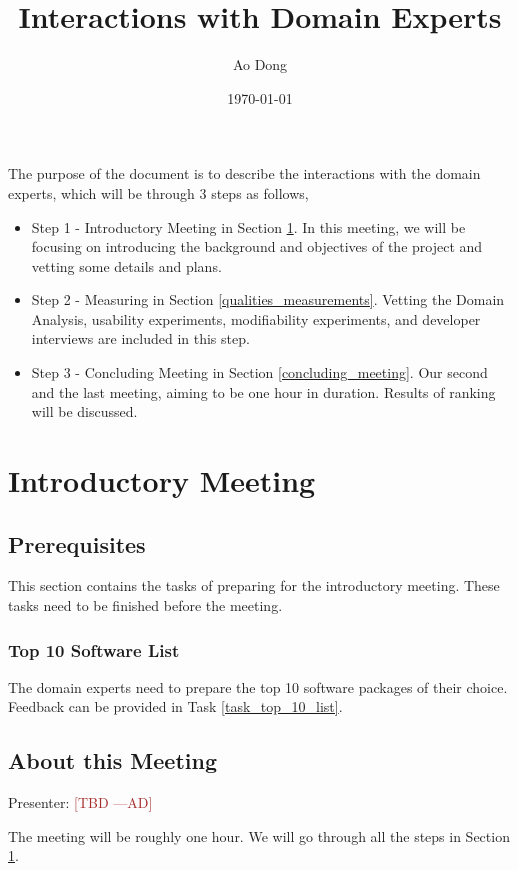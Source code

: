 \documentclass[12pt]{article}
\title{Interactions with Domain Experts}
\author{Ao Dong}
\date{\today}
\newcommand{\authornote}[3]{\textcolor{#1}{[#3 ---#2]}}
\newcommand{\authornote}[3]{}
\newcommand{\ad}[1]{\authornote{brown}{AD}{#1}} %
\begin{document}
\maketitle

The purpose of the document is to describe the interactions with the domain
experts, which will be through 3 steps as follows,
\begin{itemize}
\item Step 1 - Introductory Meeting in Section \ref{introductory_meeting}. In
this meeting, we will be focusing on introducing the background and objectives
of the project and vetting some details and plans.
\item Step 2 - Measuring in Section \ref{qualities_measurements}. Vetting the
Domain Analysis, usability experiments, modifiability experiments, and
developer interviews are included in this step.
\item Step 3 - Concluding Meeting in Section \ref{concluding_meeting}. Our
second and the last meeting, aiming to be
one hour in duration. Results of ranking will be discussed.
\end{itemize}

\section{Introductory Meeting}
\label{introductory_meeting}

\subsection{Prerequisites}
This section contains the tasks of preparing for the introductory meeting. These
tasks need to be finished before the meeting.

\subsubsection{Top 10 Software List}
\label{top_10_list}

The domain experts need to prepare the top 10 software packages of their choice.
Feedback can be provided in Task \ref{task_top_10_list}.

\subsection{About this Meeting}
Presenter: \ad{TBD}

The meeting will be roughly one hour. We will go
through all the steps in Section \ref{introductory_meeting}.
\end{document}
